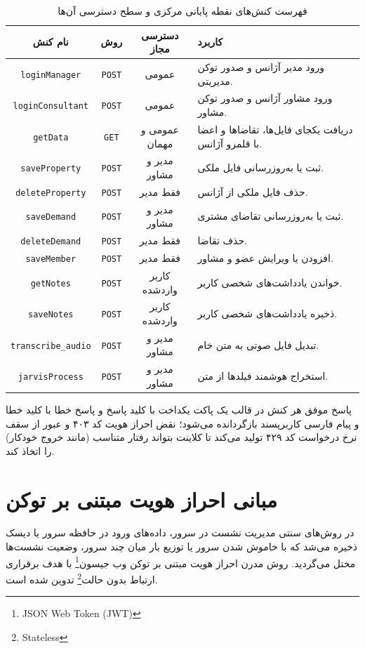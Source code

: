 \documentclass[11pt, a4paper]{report}
\makeatletter
\let\amlak@hline\hline
\newcommand{\enfootnote}[1]{\footnote{\foreignlanguage{english}{#1}}}
\newcommand{\code}[1]{\foreignlanguage{english}{\texttt{#1}}}
\let\hline\amlak@hline
\makeatother
\begin{document}
\begin{table}[htbp]
\centering
\caption{فهرست کنش‌های نقطه پایانی مرکزی و سطح دسترسی آن‌ها}
\label{tab:api_actions}
\renewcommand{\arraystretch}{1.5}
\begin{tabular}{|c|c|c|p{5.5cm}|}
\hline
\textbf{نام کنش} & \textbf{روش} & \textbf{دسترسی مجاز} & \textbf{کاربرد} \\ \hline
\code{loginManager} & \code{POST} & عمومی & ورود مدیر آژانس و صدور توکن مدیریتی. \\ \hline
\code{loginConsultant} & \code{POST} & عمومی & ورود مشاور آژانس و صدور توکن مشاور. \\ \hline
\code{getData} & \code{GET} & عمومی و مهمان & دریافت یکجای فایل‌ها، تقاضاها و اعضا با قلمرو آژانس. \\ \hline
\code{saveProperty} & \code{POST} & مدیر و مشاور & ثبت یا به‌روزرسانی فایل ملکی. \\ \hline
\code{deleteProperty} & \code{POST} & فقط مدیر & حذف فایل ملکی از آژانس. \\ \hline
\code{saveDemand} & \code{POST} & مدیر و مشاور & ثبت یا به‌روزرسانی تقاضای مشتری. \\ \hline
\code{deleteDemand} & \code{POST} & فقط مدیر & حذف تقاضا. \\ \hline
\code{saveMember} & \code{POST} & فقط مدیر & افزودن یا ویرایش عضو و مشاور. \\ \hline
\code{getNotes} & \code{POST} & کاربر واردشده & خواندن یادداشت‌های شخصی کاربر. \\ \hline
\code{saveNotes} & \code{POST} & کاربر واردشده & ذخیره یادداشت‌های شخصی کاربر. \\ \hline
\code{transcribe\_audio} & \code{POST} & مدیر و مشاور & تبدیل فایل صوتی به متن خام. \\ \hline
\code{jarvisProcess} & \code{POST} & مدیر و مشاور & استخراج هوشمند فیلدها از متن. \\ \hline
\end{tabular}
\end{table}

پاسخ موفق هر کنش در قالب یک پاکت یکداخت با کلید پاسخ و پاسخ خطا با کلید خطا و پیام فارسی کاربرپسند بازگردانده می‌شود؛ نقض احراز هویت کد ۴۰۳ و عبور از سقف نرخ درخواست کد ۴۲۹ تولید می‌کند تا کلاینت بتواند رفتار متناسب (مانند خروج خودکار) را اتخاذ کند.

\section{مبانی احراز هویت مبتنی بر توکن}
در روش‌های سنتی مدیریت نشست در سرور، داده‌های ورود در حافظه سرور یا دیسک ذخیره می‌شد که با خاموش شدن سرور یا توزیع بار میان چند سرور، وضعیت نشست‌ها مختل می‌گردید. روش مدرن احراز هویت مبتنی بر توکن وب جیسون\enfootnote{JSON Web Token (JWT)} با هدف برقراری ارتباط بدون حالت\enfootnote{Stateless} تدوین شده است.
\end{document}
